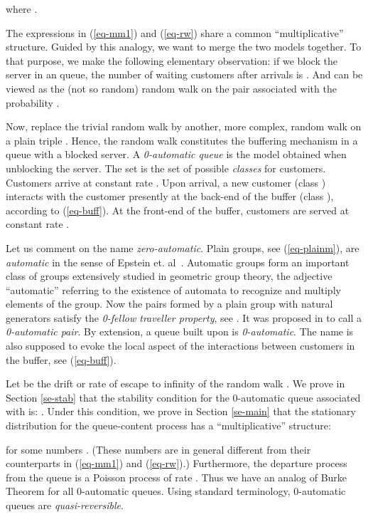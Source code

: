 \documentclass[11pt,a4paper]{article}
\theoremstyle{remark}
\def\eref#1{(\ref{#1})}
\begin{document}
where .

\medskip

The expressions in \eref{eq-mm1} and \eref{eq-rw} share a common
``multiplicative'' structure.
Guided by this analogy, we want to merge the two models together.
To that purpose, we make the following
elementary observation: if we block the server in an  queue,
the number of waiting customers after  arrivals is . And
 can be viewed as the (not so random) random walk on the
pair  associated with the probability .

Now, replace the trivial random walk  by another, more
complex, random walk  on a plain triple .
Hence, the random walk  constitutes the buffering
mechanism in a queue with a blocked server. A {\em 0-automatic
queue} is the model obtained when unblocking the server. The set
 is the set of possible {\em classes} for customers. Customers
arrive at constant rate . Upon
arrival, a new customer (class ) interacts with the customer
presently at the back-end of the buffer (class ), according to
\eref{eq-buff}. At the front-end of the buffer, customers are
served at constant rate . 

\medskip

Let us comment on the name
{\em zero-automatic}. Plain groups, see \eref{eq-plainm}, are
{\em automatic} in the sense of Epstein et. al~\cite{ECHLPT}. Automatic
groups form an important class of groups extensively studied in
geometric group theory, the adjective ``automatic'' referring to the
existence of automata to recognize and multiply elements of the
group. Now the pairs  formed by a plain group with natural
generators satisfy the {\em 0-fellow traveller property}, see
\cite{ECHLPT}. It was proposed in \cite{mair04} to call 
 a {\em 0-automatic pair}. By extension, a queue built
upon  is {\em 0-automatic}. The name is also supposed
to evoke the local aspect of the interactions between customers in the
buffer, see \eref{eq-buff}. 

\medskip

Let  be the drift or rate of escape to infinity of the random
walk . We prove in Section \ref{se-stab} that the stability
condition for the 0-automatic
queue associated with  is: . Under this
condition, we prove in Section \ref{se-main} that the stationary
distribution  for the queue-content process has a
``multiplicative'' structure:

for some numbers . (These numbers are in general different from
their counterparts in \eref{eq-mm1} and \eref{eq-rw}.)
Furthermore, the departure process from the
queue is a Poisson process of rate . Thus we have an analog
of Burke Theorem for all 0-automatic queues. Using standard
terminology, 0-automatic queues are {\em quasi-reversible}.
\end{document}
